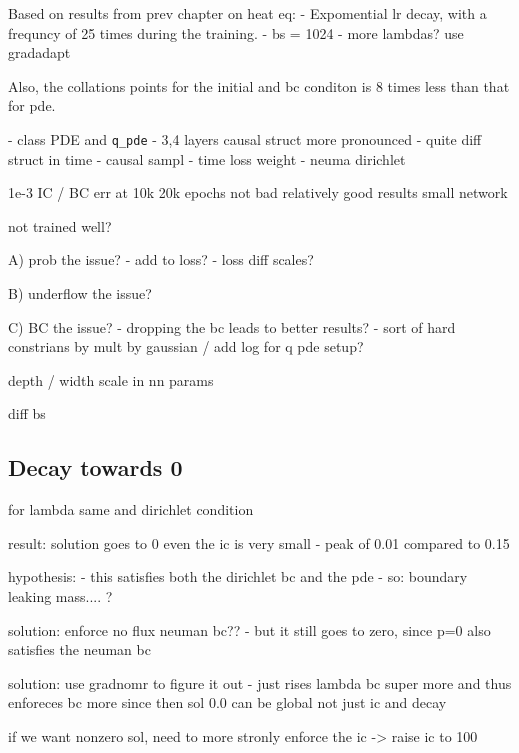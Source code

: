 Based on results from prev chapter on heat eq:
- Expomential lr decay, with a frequncy of 25 times during the training.
- bs = 1024
- more lambdas? use gradadapt

Also, the collations points for the initial and bc conditon is 8 times less than that for pde.

- class PDE and \texttt{q\_pde}
- 3,4 layers
causal struct more pronounced - quite diff struct in time
- causal sampl
- time loss weight
- neuma dirichlet


1e-3 IC / BC err at 10k 20k epochs
not bad
relatively good results
small network

not trained well?

A) prob the issue?
- add to loss?
- loss diff scales?

B) underflow the issue?

C) BC the issue?
- dropping the bc leads to better results?
- sort of hard constrians by mult by gaussian / add log for q pde setup?


depth / width scale in nn params

diff bs



\subsection{Decay towards 0}

for lambda same and dirichlet condition

result:
solution goes to 0
even the ic is very small - peak of 0.01 compared to 0.15

hypothesis:
- this satisfies both the dirichlet bc and the pde
- so: boundary leaking mass.... ?

solution:
enforce no flux neuman bc??
- but it still goes to zero, since p=0 also satisfies the neuman bc

solution:
use gradnomr to figure it out
- just rises lambda bc super more and thus enforeces bc more since then sol 0.0 can be global not just ic and decay

if we want nonzero sol, need to more stronly enforce the ic
-> raise ic to 100

